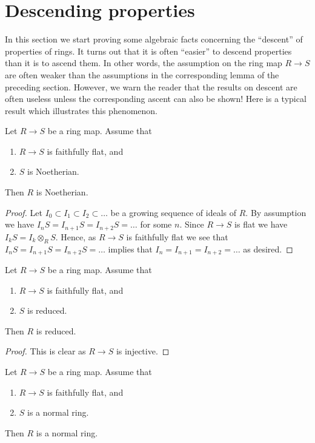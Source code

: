 \section{Descending properties}
\label{section-descending-properties}

\noindent
In this section we start proving some algebraic facts concerning the
``descent'' of properties of rings. It turns out that it is often
``easier'' to descend properties than it is to ascend them. In other
words, the assumption on the ring map $R \to S$ are often weaker than
the assumptions in the corresponding lemma of the preceding section.
However, we warn the reader that the results on descent are often
useless unless the corresponding ascent can also be shown!
Here is a typical result which illustrates this phenomenon.

\begin{lemma}
\label{lemma-descent-Noetherian}
Let $R \to S$ be a ring map.
Assume that
\begin{enumerate}
\item $R \to S$ is faithfully flat, and
\item $S$ is Noetherian.
\end{enumerate}
Then $R$ is Noetherian.
\end{lemma}

\begin{proof}
Let $I_0 \subset I_1 \subset I_2 \subset \ldots$ be a
growing sequence of ideals of $R$. By assumption we have
$I_nS = I_{n +1}S = I_{n + 2}S = \ldots$ for some $n$.
Since $R \to S$ is flat we have $I_kS = I_k \otimes_R S$.
Hence, as $R \to S$ is faithfully flat we see that
$I_nS = I_{n +1}S = I_{n + 2}S = \ldots$ implies that
$I_n = I_{n +1} = I_{n + 2} = \ldots$ as desired.
\end{proof}

\begin{lemma}
\label{lemma-descent-reduced}
Let $R \to S$ be a ring map.
Assume that
\begin{enumerate}
\item $R \to S$ is faithfully flat, and
\item $S$ is reduced.
\end{enumerate}
Then $R$ is reduced.
\end{lemma}

\begin{proof}
This is clear as $R \to S$ is injective.
\end{proof}

\begin{lemma}
\label{lemma-descent-normal}
Let $R \to S$ be a ring map.
Assume that
\begin{enumerate}
\item $R \to S$ is faithfully flat, and
\item $S$ is a normal ring.
\end{enumerate}
Then $R$ is a normal ring.
\end{lemma}

